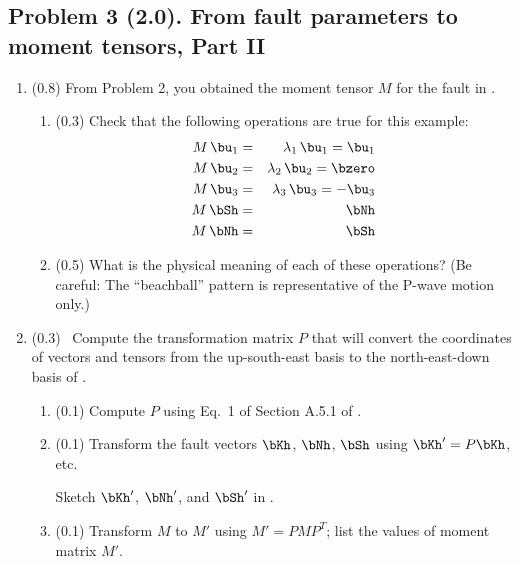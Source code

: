 \documentclass[11pt,titlepage,fleqn]{article}
\newcommand{\Mmat}{M}
\newcommand{\Pmat}{P}
\begin{document}
\subsection*{Problem 3 (2.0). From fault parameters to moment tensors, Part II}

\begin{enumerate}

\item (0.8) From Problem 2, you obtained the moment tensor $\Mmat$ for the fault in .

\begin{enumerate}
\item (0.3) Check that the following operations are true for this example:
%
\begin{eqnarray}
\Mmat \, \bu_1 &=& \lambda_1 \, \bu_1 = \bu_1
\\
\Mmat \, \bu_2 &=& \lambda_2 \, \bu_2 = \bzero
\\
\Mmat \, \bu_3 &=& \lambda_3 \, \bu_3 = -\bu_3
\\
\Mmat \, \bSh &=& \bNh
\\
\Mmat \, \bNh &=& \bSh
\end{eqnarray}

\item (0.5) What is the physical meaning of each of these operations? (Be careful: The ``beachball'' pattern is representative of the P-wave motion only.)

\end{enumerate}


\item (0.3) \ptag\ Compute the transformation matrix $\Pmat$ that will convert the coordinates of vectors and tensors from the up-south-east basis to the north-east-down basis of \citet{AkiRichardsE2}.
%
\begin{enumerate}
\item (0.1) Compute $\Pmat$ using Eq.~1 of Section A.5.1 of \cite{SteinWysession}.

\item (0.1) Transform the fault vectors $\bKh$, $\bNh$, $\bSh$ using $\bKh' = \Pmat\bKh$, etc.

Sketch $\bKh'$, $\bNh'$, and $\bSh'$ in .

\item (0.1) Transform $\Mmat$ to $\Mmat'$ using $\Mmat' = \Pmat \Mmat \Pmat^T$; list the values of moment matrix $M'$.
\end{enumerate}


\end{enumerate}
\end{document}
